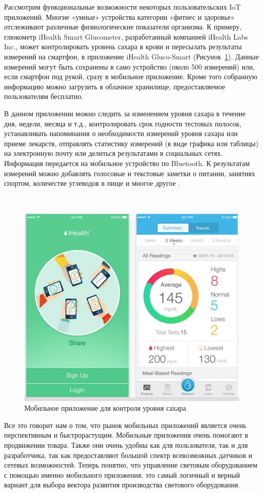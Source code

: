 Рассмотрим функциональные возможности некоторых пользовательских IoT приложений. Многие «умные» устройства категории «фитнес и здоровье» отслеживают различные физиологические показатели организма. К примеру, глюкометр iHealth Smart Glucometer, разработанный компанией iHealth Labs Inc., может контролировать уровень сахара в крови и пересылать результаты измерений на смартфон, в приложение iHealth Gluco-Smart (Рисунок~\ref{fig:subject:mobile:iHealth}). Данные измерений могут быть сохранены в само устройство (около 500 измерений) или, если смартфон под рукой, сразу в мобильное приложение. Кроме того собранную информацию можно загрузить в облачное хранилище, предоставляемое пользователям бесплатно.

В данном приложении можно следить за изменением уровня сахара в течение дня, недели, месяца и т.д., контролировать срок годности тестовых полосок, устанавливать напоминания о необходимости измерений уровня сахара или приеме лекарств, отправлять статистику измерений (в виде графика или таблицы) на электронную почту или делиться результатами в социальных сетях. Информация передается на мобильное устройство по Bluetooth. К результатам измерений можно добавлять голосовые и текстовые заметки о питании, занятиях спортом, количестве углеводов в пище и многое другое \cite{mobile_apps_iot}.

~
\begin{figure}[H]
\centering
	\includegraphics[scale=0.8]{figures/iHealth.jpg}
	\caption{Мобильное приложение для контроля уровня сахара}
	\label{fig:subject:mobile:iHealth}
\end{figure}

Все это говорит нам о том, что рынок мобильных приложений является очень перспективным и быстрорастущим. Мобильные приложения очень помогают в продвижении товара. Также они очень удобны как для пользователя, так и для разработчика, так как предоставляют большой спектр всевозможных датчиков и сетевых возможностей. Теперь понятно, что управление световым оборудованием с помощью именно мобильного приложения, это самый логичный и верный вариант для выбора вектора развития производства светового оборудования.